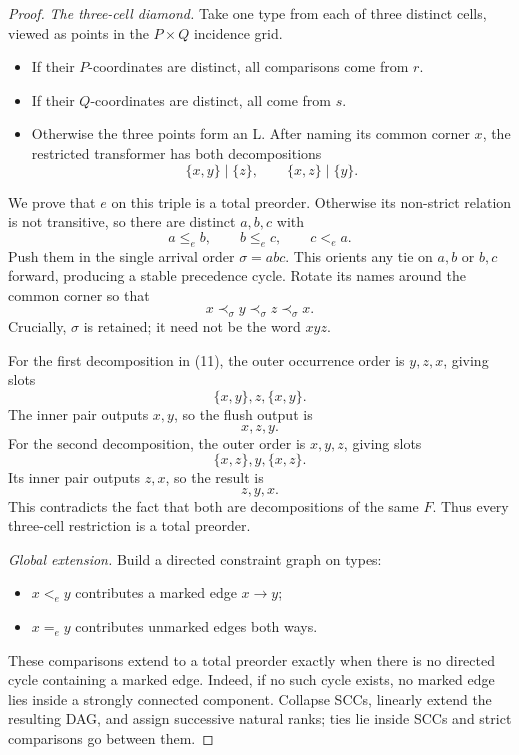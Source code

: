 \documentclass{amsart}
\theoremstyle{plain}
\theoremstyle{definition}
\begin{document}
\begin{proof}
\smallskip\noindent\textit{The three-cell diamond.} Take one type from each of three distinct cells, viewed as points in the $P\times Q$ incidence grid.
\begin{itemize}
\item If their $P$-coordinates are distinct, all comparisons come from $r$.
\item If their $Q$-coordinates are distinct, all come from $s$.
\item Otherwise the three points form an L. After naming its common corner $x$, the restricted transformer has both decompositions
\begin{equation*}
\{x,y\}\mid\{z\},
\qquad
\{x,z\}\mid\{y\}. \tag{11}
\end{equation*}
\end{itemize}
We prove that $e$ on this triple is a total preorder. Otherwise its non-strict relation is not transitive, so there are distinct $a,b,c$ with
\[
a\le_e b,\qquad b\le_e c,\qquad c<_e a.
\]
Push them in the single arrival order $\sigma=abc$. This orients any tie on $a,b$ or $b,c$ forward, producing a stable precedence cycle. Rotate its names around the common corner so that
\begin{equation*}
x\prec_\sigma y\prec_\sigma z\prec_\sigma x. \tag{12}
\end{equation*}
Crucially, $\sigma$ is retained; it need not be the word $xyz$.

For the first decomposition in (11), the outer occurrence order is $y,z,x$, giving slots
\[
\{x,y\},z,\{x,y\}.
\]
The inner pair outputs $x,y$, so the flush output is
\[
x,z,y.
\]
For the second decomposition, the outer order is $x,y,z$, giving slots
\[
\{x,z\},y,\{x,z\}.
\]
Its inner pair outputs $z,x$, so the result is
\[
z,y,x.
\]
This contradicts the fact that both are decompositions of the same $F$. Thus every three-cell restriction is a total preorder.

\smallskip\noindent\textit{Global extension.} Build a directed constraint graph on types:
\begin{itemize}
\item $x<_e y$ contributes a marked edge $x\to y$;
\item $x=_e y$ contributes unmarked edges both ways.
\end{itemize}
These comparisons extend to a total preorder exactly when there is no directed cycle containing a marked edge. Indeed, if no such cycle exists, no marked edge lies inside a strongly connected component. Collapse SCCs, linearly extend the resulting DAG, and assign successive natural ranks; ties lie inside SCCs and strict comparisons go between them.


\end{proof}
\end{document}
